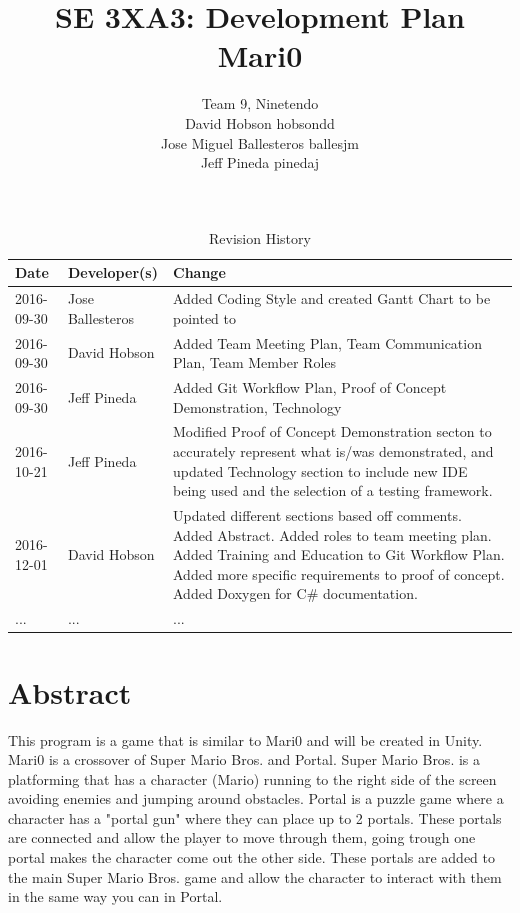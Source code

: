 \documentclass{article}
\title{SE 3XA3: Development Plan\\Mari0}
\author{Team 9, Ninetendo
		\\ David Hobson hobsondd
		\\ Jose Miguel Ballesteros ballesjm
		\\ Jeff Pineda pinedaj
}
\date{}
\begin{document}
\begin{table}[hp]
\caption{Revision History} \label{TblRevisionHistory}
\begin{tabularx}{\textwidth}{llX}
\toprule
\textbf{Date} & \textbf{Developer(s)} & \textbf{Change}\\
\midrule
2016-09-30 & Jose Ballesteros & Added Coding Style and created Gantt Chart to be pointed to\\
2016-09-30 & David Hobson & Added Team Meeting Plan, Team Communication Plan, Team Member Roles\\
2016-09-30 & Jeff Pineda & Added Git Workflow Plan, Proof of Concept Demonstration, Technology\\
2016-10-21 & Jeff Pineda & Modified Proof of Concept Demonstration secton to accurately represent what is/was demonstrated, and updated Technology section to include new IDE being used and the selection of a testing framework.\\
2016-12-01 & David Hobson & Updated different sections based off comments. Added Abstract. Added roles to team meeting plan. Added Training and Education to Git Workflow Plan. Added more specific requirements to proof of concept. Added Doxygen for C\# documentation. \\
... & ... & ...\\
\bottomrule
\end{tabularx}
\end{table}

\newpage

\maketitle

\section{Abstract}
This program is a game that is similar to Mari0 and will be created in Unity. Mari0 is a crossover of Super Mario Bros. and Portal. Super Mario Bros. is a platforming that has a character (Mario) running to the right side of the screen avoiding enemies and jumping around obstacles. Portal is a puzzle game where a character has a "portal gun" where they can place up to 2 portals. These portals are connected and allow the player to move through them, going trough one portal makes the character come out the other side. These portals are added to the main Super Mario Bros. game and allow the character to interact with them in the same way you can in Portal.
\end{document}

